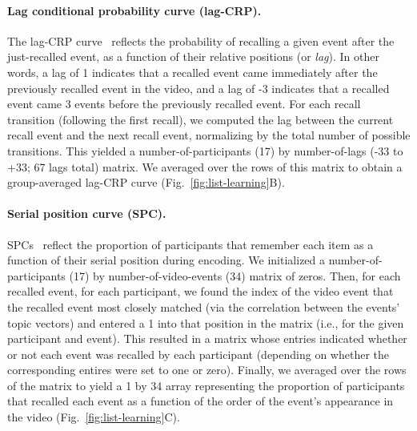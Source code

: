 \documentclass{article}
\begin{document}
\paragraph{Lag conditional probability curve (lag-CRP).} The lag-CRP curve~\citep{Kaha96} reflects the probability of recalling a given event after the just-recalled event, as a function of their relative positions (or \textit{lag}).  In other words, a lag of 1 indicates that a recalled event came immediately after the previously recalled event in the video, and a lag of -3 indicates that a recalled event came 3 events before the previously recalled event.  For each recall transition (following the first recall), we computed the lag between the current recall event and the next recall event, normalizing by the total number of possible transitions.  This yielded a number-of-participants (17) by number-of-lags (-33 to +33; 67 lags total) matrix. We averaged over the rows of this matrix to obtain a group-averaged lag-CRP curve (Fig.~\ref{fig:list-learning}B).

\paragraph{Serial position curve (SPC).} SPCs~\citep{Murd62a} reflect the proportion of participants that remember each item as a function of their serial position during encoding. We initialized a number-of-participants (17) by number-of-video-events (34) matrix of zeros. Then, for each recalled event, for each participant, we found the index of the video event that the recalled event most closely matched (via the correlation between the events' topic vectors) and entered a 1 into that position in the matrix (i.e., for the given participant and event). This resulted in a matrix whose entries indicated whether or not each event was recalled by each participant (depending on whether the corresponding entires were set to one or zero).  Finally, we averaged over the rows of the matrix to yield a 1 by 34 array representing the proportion of participants that recalled each event as a function of the order of the event's appearance in the video (Fig.~\ref{fig:list-learning}C).
\end{document}
